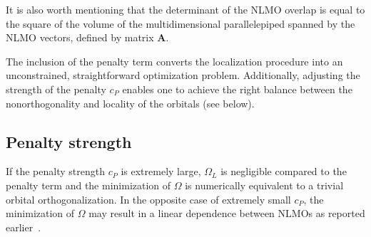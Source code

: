 \documentclass[aps,prl,reprint,amsmath,amssymb]{revtex4-1}
\newcommand{\braket}[2]{\ensuremath{\langle #1 \vert #2 \rangle}} %
\begin{document}

It is also worth mentioning that the determinant of the NLMO overlap is equal to the square of the volume of the multidimensional parallelepiped spanned by the NLMO vectors, defined by matrix $\mathbf{A}$. 

The inclusion of the penalty term converts the localization procedure into an unconstrained, straightforward optimization problem. Additionally, adjusting the strength of the penalty $c_P$ enables one to achieve the right balance between the nonorthogonality and locality of the orbitals (see below). 

\subsection{Penalty strength}

If the penalty strength $c_P$ is extremely large, $\Omega_L$ is negligible compared to the penalty term and the minimization of $\Omega$ is numerically equivalent to a trivial orbital orthogonalization. In the opposite case of extremely small $c_P$, the minimization of $\Omega$ may result in a linear dependence between NLMOs as reported earlier~\cite{cui2010efficient}. 
\end{document}
